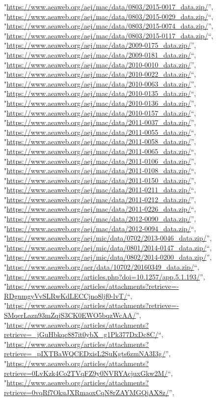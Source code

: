 \documentclass[]{article}
\begin{document}
\begin{itemize}
  "\url{https://www.aeaweb.org/aej/mac/data/0803/2015-0017_data.zip/}'',
  "\url{https://www.aeaweb.org/aej/mac/data/0803/2015-0029_data.zip/}``,
  "\url{https://www.aeaweb.org/aej/mac/data/0803/2015-0074_data.zip/}'',
  "\url{https://www.aeaweb.org/aej/mac/data/0803/2015-0117_data.zip/}``,
  "\url{https://www.aeaweb.org/aej/mac/data/2009-0175_data.zip/}'',
  "\url{https://www.aeaweb.org/aej/mac/data/2009-0181_data.zip/}``,
  "\url{https://www.aeaweb.org/aej/mac/data/2010-0010_data.zip/}'',
  "\url{https://www.aeaweb.org/aej/mac/data/2010-0022_data.zip/}``,
  "\url{https://www.aeaweb.org/aej/mac/data/2010-0063_data.zip/}'',
  "\url{https://www.aeaweb.org/aej/mac/data/2010-0135_data.zip/}``,
  "\url{https://www.aeaweb.org/aej/mac/data/2010-0136_data.zip/}'',
  "\url{https://www.aeaweb.org/aej/mac/data/2010-0157_data.zip/}``,
  "\url{https://www.aeaweb.org/aej/mac/data/2011-0037_data.zip/}'',
  "\url{https://www.aeaweb.org/aej/mac/data/2011-0055_data.zip/}``,
  "\url{https://www.aeaweb.org/aej/mac/data/2011-0058_data.zip/}'',
  "\url{https://www.aeaweb.org/aej/mac/data/2011-0065_data.zip/}``,
  "\url{https://www.aeaweb.org/aej/mac/data/2011-0106_data.zip/}'',
  "\url{https://www.aeaweb.org/aej/mac/data/2011-0108_data.zip/}``,
  "\url{https://www.aeaweb.org/aej/mac/data/2011-0150_data.zip/}'',
  "\url{https://www.aeaweb.org/aej/mac/data/2011-0211_data.zip/}``,
  "\url{https://www.aeaweb.org/aej/mac/data/2011-0212_data.zip/}'',
  "\url{https://www.aeaweb.org/aej/mac/data/2011-0226_data.zip/}``,
  "\url{https://www.aeaweb.org/aej/mac/data/2012-0090_data.zip/}'',
  "\url{https://www.aeaweb.org/aej/mac/data/2012-0094_data.zip/}``,
  "\url{https://www.aeaweb.org/aej/mic/data/0702/2013-0046_data.zip/}'',
  "\url{https://www.aeaweb.org/aej/mic/data/0801/2014-0147_data.zip/}``,
  "\url{https://www.aeaweb.org/aej/mic/data/0802/2014-0200_data.zip/}'',
  "\url{https://www.aeaweb.org/aer/data/10702/20160349_data.zip/}``,
  "\url{https://www.aeaweb.org/articles.php?doi=10.1257/app.5.1.193/}'',
  "\url{https://www.aeaweb.org/articles/attachments?retrieve=-RDgnmgyVvSLRwKdLECCjno8ljf0-lvT/}``,
  "\url{https://www.aeaweb.org/articles/attachments?retrieve=-SMqerLazn93mZqjS3CK0EWO5bqzWcAA/}'',
  "\url{https://www.aeaweb.org/articles/attachments?retrieve=_jGuHbkqc887it0ybX_g1Pk377DxDc8C/}``,
  "\url{https://www.aeaweb.org/articles/attachments?retrieve=_pIXTBaWQCEDxisL2SuKgts6zmNA3I3g/}'',
  "\url{https://www.aeaweb.org/articles/attachments?retrieve=0LvKzk4Co2TVqFZ9y0NVRYAcjuxGkw2M/}``,
  "\url{https://www.aeaweb.org/articles/attachments?retrieve=0vqRf7OkuJXRmaoxCqN8rZAYMGQjAX8z/}'',

\end{itemize}
\end{document}
